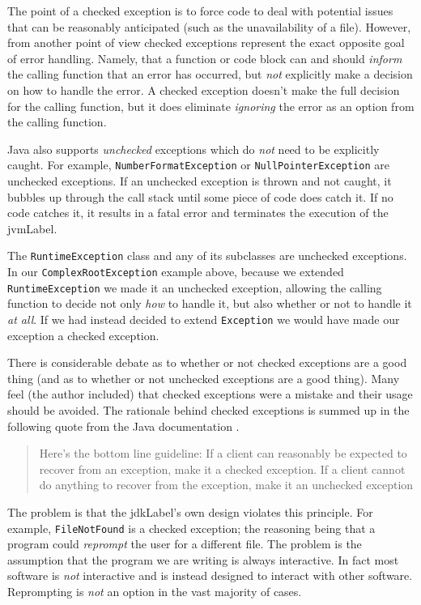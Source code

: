 The point of a checked exception is to force code to deal with
potential issues that can be reasonably anticipated (such as
the unavailability of a file).  However, from another point of 
view checked exceptions represent the exact opposite goal
of error handling.  Namely, that a function or code block can
and should \emph{inform} the calling function that an error
has occurred, but \emph{not} explicitly make a decision on
how to handle the error.  A checked exception doesn't make
the full decision for the calling function, but it does eliminate 
\emph{ignoring} the error as an option from the calling function.

Java also supports \emph{unchecked} exceptions which do
\emph{not} need to be explicitly caught.  For example, 
\texttt{NumberFormatException} or \texttt{NullPointerException}
are unchecked exceptions.  If an unchecked 
exception is thrown and not caught, it bubbles up through the
call stack until some piece of code does catch it.  If no code
catches it, it results in a fatal error and terminates the execution
of the \gls{jvmLabel}.

The \texttt{RuntimeException} class and any of its
subclasses are unchecked exceptions.  In our  \texttt{ComplexRootException}
example above, because we extended  \texttt{RuntimeException}
we made it an unchecked exception, allowing the calling
function to decide not only \emph{how} to handle it, but also
whether or not to handle it \emph{at all}.  If we had instead 
decided to extend \texttt{Exception} we would
have made our exception a checked exception.

There is considerable debate as to whether or not checked 
exceptions are a good thing (and as to whether or not unchecked
exceptions are a good thing).  Many feel (the author included) that 
checked exceptions were a mistake and their usage should be
avoided.  The rationale behind checked exceptions is summed up
in the following quote from the Java documentation \cite{javaCheckedExceptions}.

\begin{quote}
Here's the bottom line guideline: If a client can reasonably be expected 
to recover from an exception, make it a checked exception. If a client 
cannot do anything to recover from the exception, make it an unchecked 
exception
\end{quote}

The problem is that the \gls{jdkLabel}'s own design violates this principle.
For example, \texttt{FileNotFound} is a checked exception; the
reasoning being that a program could \emph{reprompt} the user for a different
file.  The problem is the assumption that the program we are writing is 
always interactive.  In fact most software is \emph{not} interactive and 
is instead designed to interact with other software.  Reprompting is \emph{not}
an option in the vast majority of cases.  

